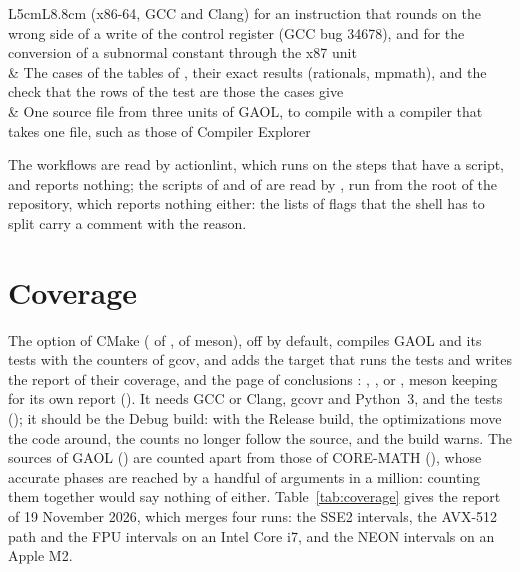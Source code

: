 \begin{longtable}{L{5cm}L{8.8cm}}
    (x86-64, GCC and Clang) for an instruction that rounds on the wrong side
    of a write of the control register (GCC bug 34678), and for the
    conversion of a subnormal constant through the x87 unit\\
   & The cases of the tables of
    , their exact results (rationals, mpmath), and
    the check that the rows of the test are those the cases give\\
   & One source file from three units of
    GAOL, to compile with a compiler that takes one file, such as those of
    Compiler Explorer\\
\end{longtable}
\endgroup

\noindent
The workflows are read by actionlint, which runs  on the
steps that have a script, and reports nothing; the scripts of
 and of  are read by
, run from the root of the repository, which reports
nothing either: the lists of flags that the shell has to split carry a
comment with the reason.\newinvfive

\section{Coverage}\label{sec:coverage}
%

The option  of CMake ( of
,  of meson), off by default, compiles
GAOL and its tests with the counters of gcov, and adds the target that runs
the tests and writes the report of their coverage,
 and the page of conclusions
: ,
, or , meson keeping
 for its own report ().\newinvfive{}
It needs GCC or Clang, gcovr and Python~3, and the tests (); it should be the Debug build: with the Release build, the optimizations move the code around, the counts no longer follow the source, and the build warns. The sources of GAOL
() are counted apart from those of CORE-MATH
(), whose accurate phases are reached by a handful of
arguments in a million: counting them together would say nothing of either.
Table~\ref{tab:coverage} gives the report of 19 November 2026, which merges four
runs: the SSE2 intervals, the AVX-512 path and the FPU intervals on an Intel
Core i7, and the NEON intervals on an Apple M2.


